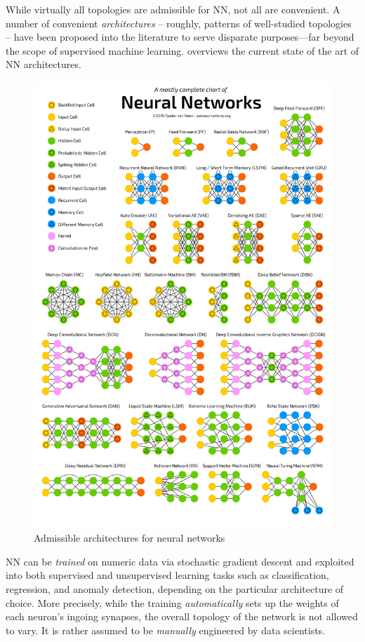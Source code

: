\documentclass[12pt,a4paper,openright,twoside]{book}
\begin{document}
While virtually all topologies are admissible for NN, not all are convenient.
%
A number of convenient \emph{architectures} -- roughly, patterns of well-studied topologies -- have been proposed into the literature \cite{VanVeenL2019} to serve disparate purposes---far beyond the scope of supervised machine learning.
%
 overviews the current state of the art of NN architectures.
%
\begin{figure}
    \centering
    \includegraphics[width=.8\linewidth]{figures/neural-network-architectures.png}
    \caption[Admissible architectures for neural networks]{Admissible architectures for neural networks \cite{VanVeenL2019}}
    \label{fig:nn-architectures}
\end{figure}

NN can be \emph{trained} on numeric data via stochastic gradient descent and exploited into both supervised and unsupervised learning tasks such as classification, regression, and anomaly detection, depending on the particular architecture of choice.
%
More precisely, while the training \emph{automatically} sets up the weights of each neuron's ingoing synapses, the overall topology of the network is not allowed to vary.
%
It is rather assumed to be \emph{manually} engineered by data scientists.
\end{document}
